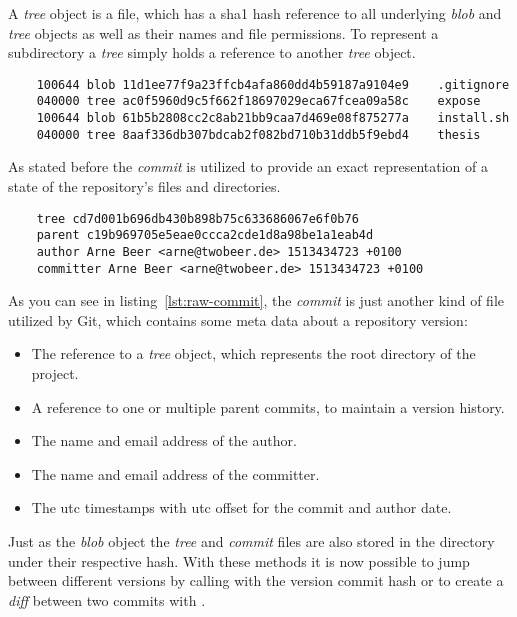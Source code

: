 A \emph{tree} object is a file, which has a \ac{sha1} hash reference to all underlying \emph{blob} and \emph{tree} objects as well as their names and file permissions.
To represent a subdirectory a \emph{tree} simply holds a reference to another \emph{tree} object.

\begin{verbatim}
    100644 blob 11d1ee77f9a23ffcb4afa860dd4b59187a9104e9	.gitignore
    040000 tree ac0f5960d9c5f662f18697029eca67fcea09a58c	expose
    100644 blob 61b5b2808cc2c8ab21bb9caa7d469e08f875277a	install.sh
    040000 tree 8aaf336db307bdcab2f082bd710b31ddb5f9ebd4	thesis
\end{verbatim}
\begingroup
{}
\endgroup

As stated before the \emph{commit} is utilized to provide an exact representation of a state of the repository's files and directories.

\begin{verbatim}
    tree cd7d001b696db430b898b75c633686067e6f0b76
    parent c19b969705e5eae0ccca2cde1d8a98be1a1eab4d
    author Arne Beer <arne@twobeer.de> 1513434723 +0100
    committer Arne Beer <arne@twobeer.de> 1513434723 +0100
\end{verbatim}
\begingroup
{}
\endgroup

As you can see in listing~\ref{lst:raw-commit}, the \emph{commit} is just another kind of file utilized by Git, which contains some meta data about a repository version:

\begin{itemize}
    \item The reference to a \emph{tree} object, which represents the root directory of the project.
    \item A reference to one or multiple parent commits, to maintain a version history.
    \item The name and email address of the author.
    \item The name and email address of the committer.
    \item The \ac{utc} timestamps with \ac{utc} offset for the commit and author date.
\end{itemize}

Just as the \emph{blob} object the \emph{tree} and \emph{commit} files are also stored in the  directory under their respective hash.
With these methods it is now possible to jump between different versions by calling  with the version commit hash or to create a \emph{diff} between two commits with .
